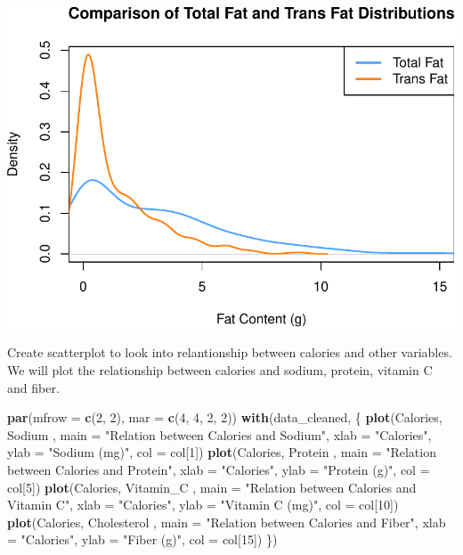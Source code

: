 \documentclass[
]{article}
\newenvironment{Shaded}{\begin{snugshade}}{\end{snugshade}}
\newcommand{\AttributeTok}[1]{\textcolor[rgb]{0.13,0.29,0.53}{#1}}
\newcommand{\DecValTok}[1]{\textcolor[rgb]{0.00,0.00,0.81}{#1}}
\newcommand{\FunctionTok}[1]{\textcolor[rgb]{0.13,0.29,0.53}{\textbf{#1}}}
\newcommand{\NormalTok}[1]{#1}
\newcommand{\StringTok}[1]{\textcolor[rgb]{0.31,0.60,0.02}{#1}}
\begin{document}
\begin{center}\includegraphics{Statistical_Learning_Final_Report_files/figure-latex/fat_comparison-2} \end{center}

Create scatterplot to look into relantionship between calories and other
variables. We will plot the relationship between calories and sodium,
protein, vitamin C and fiber.

\begin{Shaded}
\begin{Highlighting}[]
\FunctionTok{par}\NormalTok{(}\AttributeTok{mfrow =} \FunctionTok{c}\NormalTok{(}\DecValTok{2}\NormalTok{, }\DecValTok{2}\NormalTok{), }\AttributeTok{mar =} \FunctionTok{c}\NormalTok{(}\DecValTok{4}\NormalTok{, }\DecValTok{4}\NormalTok{, }\DecValTok{2}\NormalTok{, }\DecValTok{2}\NormalTok{))}
\FunctionTok{with}\NormalTok{(data\_cleaned, \{}
  \FunctionTok{plot}\NormalTok{(Calories, Sodium , }\AttributeTok{main =} \StringTok{"Relation between Calories and Sodium"}\NormalTok{,}
       \AttributeTok{xlab =} \StringTok{"Calories"}\NormalTok{, }\AttributeTok{ylab =} \StringTok{"Sodium (mg)"}\NormalTok{, }\AttributeTok{col =}\NormalTok{ col[}\DecValTok{1}\NormalTok{])}
  \FunctionTok{plot}\NormalTok{(Calories, Protein , }\AttributeTok{main =} \StringTok{"Relation between Calories and Protein"}\NormalTok{,}
       \AttributeTok{xlab =} \StringTok{"Calories"}\NormalTok{, }\AttributeTok{ylab =} \StringTok{"Protein (g)"}\NormalTok{, }\AttributeTok{col =}\NormalTok{ col[}\DecValTok{5}\NormalTok{])}
  \FunctionTok{plot}\NormalTok{(Calories, Vitamin\_C , }\AttributeTok{main =} \StringTok{"Relation between Calories and Vitamin C"}\NormalTok{,}
       \AttributeTok{xlab =} \StringTok{"Calories"}\NormalTok{, }\AttributeTok{ylab =} \StringTok{"Vitamin C (mg)"}\NormalTok{, }\AttributeTok{col =}\NormalTok{ col[}\DecValTok{10}\NormalTok{])}
  \FunctionTok{plot}\NormalTok{(Calories, Cholesterol , }\AttributeTok{main =} \StringTok{"Relation between Calories and Fiber"}\NormalTok{,}
       \AttributeTok{xlab =} \StringTok{"Calories"}\NormalTok{, }\AttributeTok{ylab =} \StringTok{"Fiber (g)"}\NormalTok{, }\AttributeTok{col =}\NormalTok{ col[}\DecValTok{15}\NormalTok{])}
\NormalTok{\})}
\end{Highlighting}
\end{Shaded}
\end{document}
